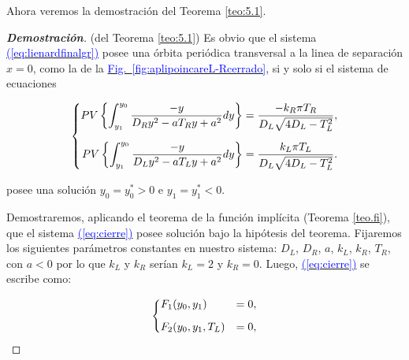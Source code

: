 \documentclass[12pt,a4paper]{report} %
\newcommand{\fref}[1]{\hyperref[#1]{\textcolor{blue}{Fig.~\ref*{#1}}}}
\newcommand{\eref}[1]{\hyperref[#1]{\textcolor{blue}{(\ref*{#1})}}}
\begin{document}
	\vspace{0.5cm}\noindent Ahora veremos la demostración del Teorema \ref{teo:5.1}.
	\begin{proof}[\textbf{Demostración}](del Teorema \ref{teo:5.1})
		\label{dem5.1}
	Es obvio que el sistema \eref{eq:lienardfinalgr} posee una órbita periódica transversal a la linea de separación $x=0$, como la de la \fref{fig:aplipoincareL-Rcerrado}, si y solo si el sistema de ecuaciones
	
	\begin{equation}
		\label{eq:cierre}
		\scalebox{1}{$\displaystyle
			\left\{
			\begin{aligned}
				PV\left\{\int_{y_1}^{y_0}\frac{-y}{D_Ry^2-aT_Ry+a^2}dy\right\}&=\frac{-k_R\pi T_R}{D_L\sqrt{4D_L-T_L^2}},
				\\[2mm]
				PV\left\{\int_{y_1}^{y_0}\frac{-y}{D_Ly^2-aT_Ly+a^2}dy\right\}&=\frac{k_L\pi T_L}{D_L\sqrt{4D_L-T_L^2}}.
			\end{aligned}
			\right. 
			$}
	\end{equation}\smallskip
	
	\vspace{0.5cm}\noindent posee una solución $y_0=y_0^*>0$ e $y_1=y_1^*<0$.
	
	\vspace{0.5cm}\noindent Demostraremos, aplicando el teorema de la función implícita (Teorema \ref{teo.fi}), que el sistema \eref{eq:cierre} posee solución bajo la hipótesis del teorema. Fijaremos los siguientes parámetros constantes en nuestro sistema: $D_L$, $D_R$, $a$, $k_L$, $k_R$, $T_R$, con $a<0$ por lo que $k_L$ y $k_R$ serían $k_L=2$ y $k_R=0$. Luego, \eref{eq:cierre} se escribe como:
	

	
	\begin{equation}
		\label{eq:cierre3}
		\scalebox{1}{$\displaystyle
			\left\{
			\begin{aligned}
				&F_1(y_0,y_1)&=0,
				\\[2mm]
				&F_2(y_0,y_1,T_L)&=0,
			\end{aligned}
			\right. 
			$}
	\end{equation}\smallskip
	

\end{proof}
\end{document}
